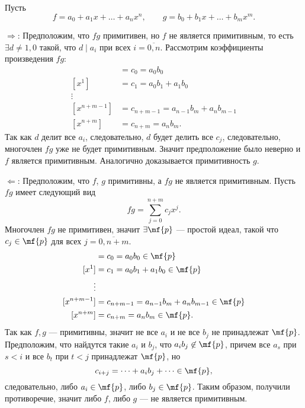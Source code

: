     \begin{Proof}
        Пусть 
        $$
            f = a_0 + a_1x + \dots + a_nx^n, \qquad g = b_0 + b_1x + \dots + b_mx^m.
        $$

        $\Rightarrow$: Предположим, что $fg$ примитивен, но $f$ не является примитивным, то есть $\exists d \neq 1, 0$ такой, что $ d \mid a_i$ при всех $i = \overline{0, n}$.
        Рассмотрим коэффициенты произведения $fg$:
        \begin{align*}
            [x^0] &= c_0 = a_0b_0\\
            [x^1] &= c_1 = a_0b_1 + a_1b_0 \\
            \vdots\\
            [x^{n + m - 1}] &= c_{n + m-1} = a_{n-1}b_m + a_nb_{m-1}\\
            [x^{n + m}] &= c_{n + m} = a_nb_m.
        \end{align*}
        Так как $d$ делит все $a_i$, следовательно, $d$ будет делить все $c_j$, следовательно, многочлен $fg$ уже не будет примитивным. Значит предположение было неверно и $f$ является примитивным.
        Аналогично доказывается примитивность $g$.

        $\Leftarrow$: Предположим, что $f$, $g$ примитивны, а $fg$ не является примитивным. Пусть $fg$ имеет следующий вид
        $$
            fg = \sum_{j = 0}^{n + m} c_jx^j.
        $$
        Многочлен $fg$ не примитивен, значит $\exists \mf{p}$ --- простой идеал, такой что $c_j \in \mf{p}$ для всех $j = \overline{0, n+m}$. 
        \begin{align*}
            [x^0] &= c_0 = a_0b_0 \in \mf{p}\\
            [x^1] &= c_1 = a_0b_1 + a_1b_0 \in \mf{p} \\
            \vdots\\
            [x^{n + m - 1}] &= c_{n + m-1} = a_{n-1}b_m + a_nb_{m-1} \in \mf{p}\\
            [x^{n + m}] &= c_{n + m} = a_nb_m \in \mf{p}.
        \end{align*}
        Так как $f, g$ --- примитивны, значит не все $a_i$ и не все $b_j$ не принадлежат $\mf{p}$.
        Предположим, что найдутся такие $a_i$ и $b_j$, что $a_ib_j \not \in \mf{p}$, причем все $a_s$ при $s < i$ и все $b_t$ при $t < j$ принадлежат $\mf{p}$, но 
        $$
            c_{i + j} = \dots + a_ib_j + \dots \in \mf{p},
        $$ 
        следовательно, либо $a_i \in \mf{p}$, либо $b_j \in \mf{p}$. Таким образом, получили противоречие, значит либо $f$, либо $g$ --- не является примитивным.
    \end{Proof}

